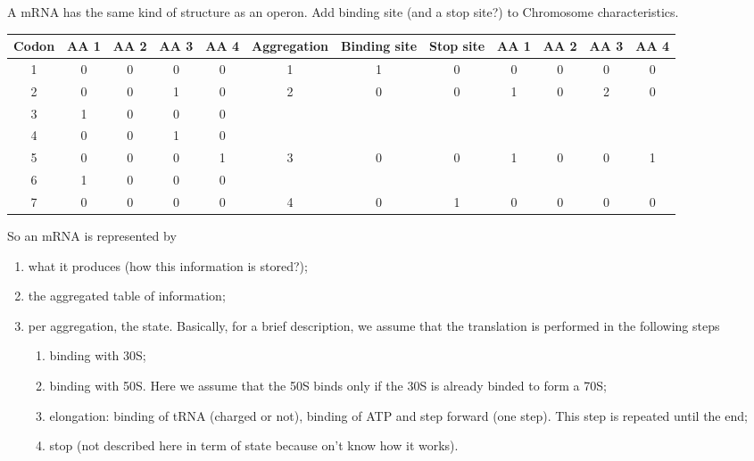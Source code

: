 A mRNA has the same kind of structure as an operon. \textcolor[rgb]{1.00,0.00,0.00}{Add binding site (and a stop site?) to Chromosome characteristics.}
\begin{center}
  \tiny
  \begin{tabular}{|c|c|c|c|c||c|c|c|c|c|c|c|}
    \hline
    Codon & AA 1 & AA 2 & AA 3 & AA 4 & Aggregation & Binding site & Stop site & AA 1 & AA 2 & AA 3 & AA 4 \\
    \hline
      1   &  0   &  0   &   0  &   0  &       1     &      1       &     0     &   0  &  0   &   0  &   0  \\
    \hline
      2   &  0   &  0   &   1  &   0  &  \multirow{3}{*}{2} & \multirow{3}{*}{0} & \multirow{3}{*}{0} & \multirow{3}{*}{1} & \multirow{3}{*}{0} & \multirow{3}{*}{2} & \multirow{3}{*}{0} \\
      3   &  1   &  0   &   0  &   0  & & & & & & & \\
      4   &  0   &  0   &   1  &   0  & & & & & & & \\
    \hline
      5   &  0   &  0   &   0  &   1  &  \multirow{2}{*}{3} & \multirow{2}{*}{0} & \multirow{2}{*}{0} & \multirow{2}{*}{1} & \multirow{2}{*}{0} & \multirow{2}{*}{0} & \multirow{2}{*}{1} \\
      6   &  1   &  0   &   0  &   0  & & & & & & & \\
    \hline
      7   &  0   &  0   &   0  &   0  &      4      &      0       &     1     &   0  &  0   &   0  &   0  \\
    \hline
  \end{tabular}
\end{center}
So an mRNA is represented by
\begin{enumerate}
  \item what it produces (how this information is stored?);
  \item the aggregated table of information;
  \item per aggregation, the state. Basically, for a brief description, we assume that the translation is performed in the following steps
  \begin{enumerate}
    \item binding with 30S;
    \item binding with 50S. Here we assume that the 50S binds only if the 30S is already binded to form a 70S;
    \item elongation: binding of tRNA (charged or not), binding of ATP and step forward (one step). This step is repeated until the end;
    \item stop (not described here in term of state because on't know how it works).
  \end{enumerate}
\end{enumerate}
